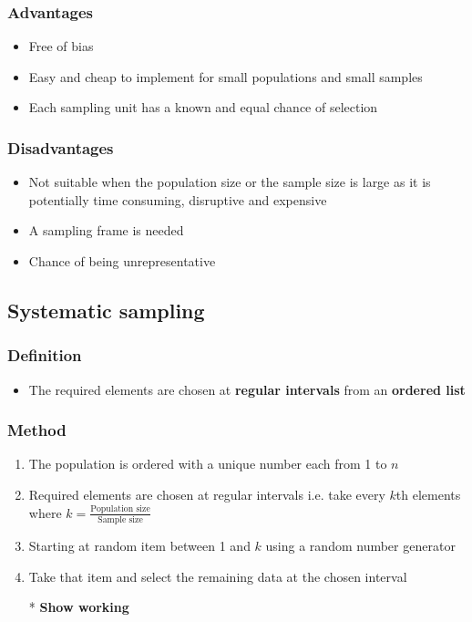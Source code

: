 \subsubsection{Advantages}
\begin{itemize}
    \item Free of bias
    \item Easy and cheap to implement for small populations and small samples
    \item Each sampling unit has a known and equal chance of selection
\end{itemize}
\subsubsection{Disadvantages}
\begin{itemize}
    \item Not suitable when the population size or the sample size is large as it is potentially time consuming, disruptive and expensive
    \item A sampling frame is needed
    \item Chance of being unrepresentative
\end{itemize}
\subsection{Systematic sampling}
\subsubsection{Definition}
\begin{itemize}
    \item The required elements are chosen at \textbf{regular intervals} from an \textbf{ordered list}
\end{itemize}
\subsubsection{Method}
\begin{enumerate}
    \item The population is ordered with a unique number each from 1 to $n$
    \item Required elements are chosen at regular intervals i.e. take every $k$th elements where $k=\frac{\text{Population size}}{\text{Sample size}}$
    \item Starting at random item between 1 and $k$ using a random number generator
    \item Take that item and select the remaining data at the chosen interval
    \item[*] \textbf{Show working}
\end{enumerate}
